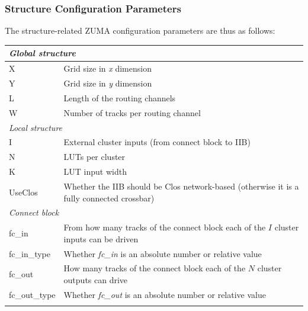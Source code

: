 \documentclass{article}
\begin{document}
\subsubsection{Structure Configuration Parameters}
The structure-related ZUMA configuration parameters are thus as follows:\\[1.5mm]
\renewcommand{\arraystretch}{1.2}%
\begin{tabularx}{\textwidth}{lX}
    \hline 
    \multicolumn{2}{l}{\emph{Global structure}} \\
    \hline 
    X             & Grid size in \emph{x} dimension \\
    Y             & Grid size in \emph{y} dimension \\
    L             & Length of the routing channels \\
    W             & Number of tracks per routing channel \\
    \hline 
    \multicolumn{2}{l}{\emph{Local structure}} \\
    \hline 
    I             & External cluster inputs (from connect block to IIB) \\
    N             & LUTs per cluster \\
    K             & LUT input width \\
    UseClos       & Whether the IIB should be Clos network-based (otherwise it is a fully connected crossbar) \\
    \cline{1-1} 
    \multicolumn{2}{l}{\emph{Connect block}} \\
    \cline{1-1} 
    fc\_in        & From how many tracks of the connect block each of the \(I\) cluster inputs can be driven \\
    fc\_in\_type  & Whether \emph{fc\_in} is an absolute number or relative value \\
    fc\_out       & How many tracks of the connect block each of the \(N\) cluster outputs can drive\\
    fc\_out\_type & Whether \emph{fc\_out} is an absolute number or relative value \\
    \hline \\
\end{tabularx}
\end{document}
